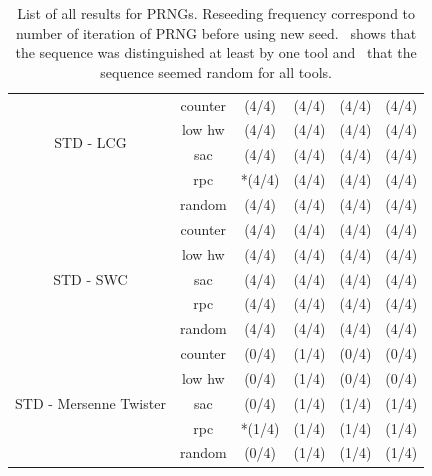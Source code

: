 \documentclass[
    digital,    %
    oneside,    %
    color,
    11pt,
    nocover,
    notable,
    nolof,
    nolot,
    final
]{fithesis3}
\newcommand{\fd}{\cellcolor{red!25}}
\newcommand{\fn}{\cellcolor{green!25}}
\renewcommand\_{\textunderscore\allowbreak}
\newcommand{\cmark}{\ding{51}}%
\newcommand{\xmark}{\ding{55}}%
\begin{document}
\begin{table}[H]
\begin{tabular}{|c|c|c|c|c|c|}
		\multirow{4}{*}{STD - LCG} & counter &  \fd \xmark (4/4) & \fd \xmark (4/4) & \fd \xmark (4/4) & \fd \xmark (4/4) \\ \cline{2-6}
		& low hw &  \fd \xmark (4/4) & \fd \xmark (4/4) & \fd \xmark (4/4) & \fd \xmark (4/4) \\ \cline{2-6}
		& sac &  \fd \xmark (4/4) & \fd \xmark (4/4) & \fd \xmark (4/4) & \fd \xmark (4/4) \\ \cline{2-6}
		& rpc &  *\fd \xmark (4/4) & \fd \xmark (4/4) & \fd \xmark (4/4) & \fd \xmark (4/4) \\ \cline{2-6}
		& random &  \fd \xmark (4/4) & \fd \xmark (4/4) & \fd \xmark (4/4) & \fd \xmark (4/4) \\
		\hline \hline
		
		\multirow{5}{*}{STD - SWC} & counter &  \fd \xmark (4/4) & \fd \xmark (4/4) & \fd \xmark (4/4) & \fd \xmark (4/4) \\ \cline{2-6}
		& low hw &  \fd \xmark (4/4) & \fd \xmark (4/4) & \fd \xmark (4/4) & \fd \xmark (4/4) \\ \cline{2-6}
		& sac &  \fd \xmark (4/4) & \fd \xmark (4/4) & \fd \xmark (4/4) & \fd \xmark (4/4) \\ \cline{2-6}
		& rpc &  \fd \xmark (4/4) & \fd \xmark (4/4) & \fd \xmark (4/4) & \fd \xmark (4/4) \\ \cline{2-6}
		& random &  \fd \xmark (4/4) & \fd \xmark (4/4) & \fd \xmark (4/4) & \fd \xmark (4/4) \\
		\hline \hline
		
		\multirow{5}{*}{STD - Mersenne Twister} & counter &  \fn \cmark (0/4) & \fd \xmark (1/4) & \fn \cmark (0/4) & \fn \cmark (0/4) \\ \cline{2-6}
		& low hw &  \fn \cmark (0/4) & \fd \xmark (1/4) & \fn \cmark (0/4) & \fn \cmark (0/4) \\ \cline{2-6}
		& sac &  \fn \cmark (0/4) & \fd \xmark (1/4) & \fd \xmark (1/4) & \fd \xmark (1/4) \\ \cline{2-6}
		& rpc &  *\fd \xmark (1/4) & \fd \xmark (1/4) & \fd \xmark (1/4) & \fd \xmark (1/4) \\ \cline{2-6}
		& random &  \fn \cmark (0/4) & \fd \xmark (1/4) & \fd \xmark (1/4) & \fd \xmark (1/4) \\
		\hline
	\end{tabular}
	
	\caption{List of all results for PRNGs. Reseeding frequency correspond to number of iteration of PRNG before using new seed. \xmark~shows that the sequence was distinguished at least by one tool and \cmark~that the sequence seemed random for all tools.}
	\label{table:prng-results}
\end{table}
\end{document}
